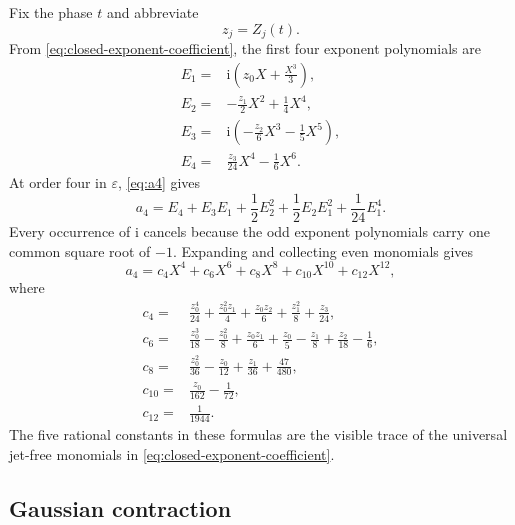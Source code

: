 \documentclass[11pt,oneside]{article}
\theoremstyle{definition}
\theoremstyle{remark}
\newcommand{\ii}{\mathrm i}
\begin{document}
Fix the phase $t$ and abbreviate
\begin{equation}
 z_j=Z_j(t).
 \label{eq:zj-abbreviation}
\end{equation}
From \eqref{eq:closed-exponent-coefficient}, the first four exponent polynomials are
\begin{align}
 E_1={}&\ii\left(z_0X+\frac{X^3}{3}\right),                 \label{eq:E1-explicit}\\
 E_2={}&-\frac{z_1}{2}X^2+\frac14X^4,                       \label{eq:E2-explicit}\\
 E_3={}&\ii\left(-\frac{z_2}{6}X^3-\frac15X^5\right),      \label{eq:E3-explicit}\\
 E_4={}&\frac{z_3}{24}X^4-\frac16X^6.                      \label{eq:E4-explicit}
\end{align}
At order four in $\varepsilon$, \eqref{eq:a4} gives
\begin{equation}
 a_4=E_4+E_3E_1+\frac12E_2^2
     +\frac12E_2E_1^2+\frac1{24}E_1^4.
 \label{eq:a4-saddle}
\end{equation}
Every occurrence of $\ii$ cancels because the odd exponent polynomials carry one common
square root of $-1$.  Expanding and collecting even monomials gives
\begin{equation}
 a_4=c_4X^4+c_6X^6+c_8X^8+c_{10}X^{10}+c_{12}X^{12},
 \label{eq:a4-even-polynomial}
\end{equation}
where
\begin{align}
 c_4={}&\frac{z_0^4}{24}+\frac{z_0^2z_1}{4}
       +\frac{z_0z_2}{6}+\frac{z_1^2}{8}+\frac{z_3}{24},     \label{eq:c4}\\
 c_6={}&\frac{z_0^3}{18}-\frac{z_0^2}{8}+\frac{z_0z_1}{6}
       +\frac{z_0}{5}-\frac{z_1}{8}+\frac{z_2}{18}-\frac16, \label{eq:c6}\\
 c_8={}&\frac{z_0^2}{36}-\frac{z_0}{12}+\frac{z_1}{36}
       +\frac{47}{480},                                      \label{eq:c8}\\
 c_{10}={}&\frac{z_0}{162}-\frac1{72},                       \label{eq:c10}\\
 c_{12}={}&\frac1{1944}.                                     \label{eq:c12}
\end{align}
The five rational constants in these formulas are the visible trace of the universal
jet-free monomials in \eqref{eq:closed-exponent-coefficient}.

\subsection{Gaussian contraction}
\end{document}
